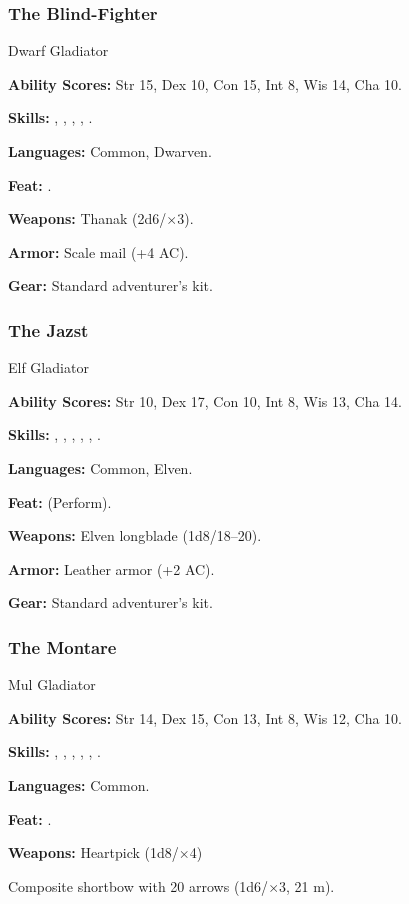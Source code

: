 \subsubsection{The Blind-Fighter}
Dwarf Gladiator

\textbf{Ability Scores:} Str 15, Dex 10, Con 15, Int 8, Wis 14, Cha 10.

\textbf{Skills:} , , , , .

\textbf{Languages:} Common, Dwarven.

\textbf{Feat:} .

\textbf{Weapons:} Thanak (2d6/$\times$3).

\textbf{Armor:} Scale mail (+4 AC).

\textbf{Gear:} Standard adventurer's kit.

\subsubsection{The Jazst}
Elf Gladiator

\textbf{Ability Scores:} Str 10, Dex 17, Con 10, Int 8, Wis 13, Cha 14.

\textbf{Skills:} , , , , , .

\textbf{Languages:} Common, Elven.

\textbf{Feat:}  (Perform).

\textbf{Weapons:} Elven longblade (1d8/18--20).

\textbf{Armor:} Leather armor (+2 AC).

\textbf{Gear:} Standard adventurer's kit.

\subsubsection{The Montare}
Mul Gladiator

\textbf{Ability Scores:} Str 14, Dex 15, Con 13, Int 8, Wis 12, Cha 10.

\textbf{Skills:} , , , , , .

\textbf{Languages:} Common.

\textbf{Feat:} .

\textbf{Weapons:} Heartpick (1d8/$\times$4)

Composite shortbow with 20 arrows (1d6/$\times$3, 21 m).

